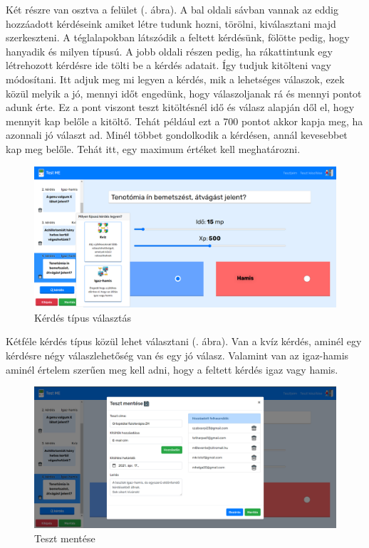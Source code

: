 \noindent Két részre van osztva a felület (. ábra). A bal oldali sávban vannak az eddig hozzáadott kérdéseink amiket létre tudunk hozni, törölni, kiválasztani majd szerkeszteni. A téglalapokban látszódik a feltett kérdésünk, fölötte pedig, hogy hanyadik és milyen típusú. A jobb oldali részen pedig, ha rákattintunk egy létrehozott kérdésre ide tölti be a kérdés adatait. Így tudjuk kitölteni vagy módosítani. Itt adjuk meg mi legyen a kérdés, mik a lehetséges válaszok, ezek közül melyik a jó, mennyi időt engedünk, hogy válaszoljanak rá és mennyi pontot adunk érte. Ez a pont viszont teszt kitöltésnél idő és válasz alapján dől el, hogy mennyit kap belőle a kitöltő. Tehát például ezt a 700 pontot akkor kapja meg, ha azonnali jó választ ad. Minél többet gondolkodik a kérdésen, annál kevesebbet kap meg belőle. Tehát itt, egy maximum értéket kell meghatározni.

\begin{figure}[H]
    \centering
    \includegraphics[width=\linewidth]{images/make_test2.png}
    \caption{Kérdés típus választás}
    \label{fig:make_test2}
\end{figure}

Kétféle kérdés típus közül lehet választani (. ábra). Van a kvíz kérdés, aminél egy kérdésre négy válaszlehetőség van és egy jó válasz. Valamint van az igaz-hamis aminél értelem szerűen meg kell adni, hogy a feltett kérdés igaz vagy hamis.

\begin{figure}[H]
    \centering
    \includegraphics[width=\linewidth]{images/make_test3.png}
    \caption{Teszt mentése}
    \label{fig:make_test3}
\end{figure}

